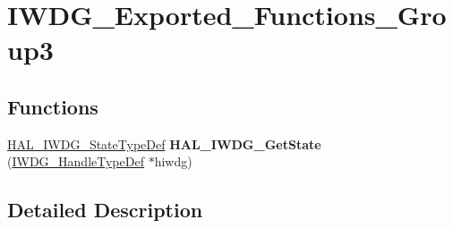 \hypertarget{group___i_w_d_g___exported___functions___group3}{}\section{I\+W\+D\+G\+\_\+\+Exported\+\_\+\+Functions\+\_\+\+Group3}
\label{group___i_w_d_g___exported___functions___group3}
\subsection*{Functions}
\begin{DoxyCompactItemize}
\item 
\hyperlink{group___i_w_d_g___exported___types_ga61699dc6f24a3edecddd16018560d0e5}{H\+A\+L\+\_\+\+I\+W\+D\+G\+\_\+\+State\+Type\+Def} {\bfseries H\+A\+L\+\_\+\+I\+W\+D\+G\+\_\+\+Get\+State} (\hyperlink{struct_i_w_d_g___handle_type_def}{I\+W\+D\+G\+\_\+\+Handle\+Type\+Def} $\ast$hiwdg)\hypertarget{group___i_w_d_g___exported___functions___group3_ga4b2f32b043612fdd1b68f806115d8de4}{}\label{group___i_w_d_g___exported___functions___group3_ga4b2f32b043612fdd1b68f806115d8de4}

\end{DoxyCompactItemize}


\subsection{Detailed Description}
